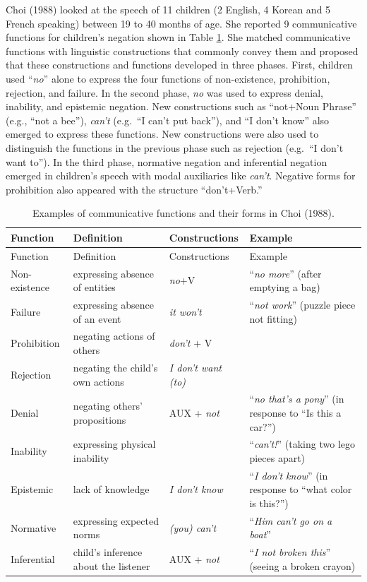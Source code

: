 \documentclass[
  english,
  man,floatsintext]{apa6}
\begin{document}
Choi (1988) looked at the speech of 11 children (2 English, 4 Korean and 5 French speaking) between 19 to 40 months of age. She reported 9 communicative functions for children's negation shown in Table \ref{tab:choi}. She matched communicative functions with linguistic constructions that commonly convey them and proposed that these constructions and functions developed in three phases. First, children used ``\emph{no}'' alone to express the four functions of non-existence, prohibition, rejection, and failure. In the second phase, \emph{no} was used to express denial, inability, and epistemic negation. New constructions such as ``not+Noun Phrase'' (e.g., ``not a bee''), \emph{can't} (e.g.~``I can't put back''), and ``I don't know'' also emerged to express these functions. New constructions were also used to distinguish the functions in the previous phase such as rejection (e.g.~``I don't want to''). In the third phase, normative negation and inferential negation emerged in children's speech with modal auxiliaries like \emph{can't}. Negative forms for prohibition also appeared with the structure ``don't+Verb.''

\begin{longtable}[]{@{}
  >{\raggedright\arraybackslash}p{}
  >{\raggedright\arraybackslash}p{}
  >{\raggedright\arraybackslash}p{}
  >{\raggedright\arraybackslash}p{}@{}}
\caption{\label{tab:choi} Examples of communicative functions and their forms in Choi (1988).}\tabularnewline
\toprule
Function & Definition & Constructions & Example \\
\midrule
\endfirsthead
\toprule
Function & Definition & Constructions & Example \\
\midrule
\endhead
Non-existence & expressing absence of entities & \emph{no}+V & ``\emph{no more}'' (after emptying a bag) \\
Failure & expressing absence of an event & \emph{it won't} & ``\emph{not work}'' (puzzle piece not fitting) \\
Prohibition & negating actions of others & \emph{don't} + V & \\
Rejection & negating the child's own actions & \emph{I don't want (to)} & \\
Denial & negating others' propositions & AUX + \emph{not} & ``\emph{no that's a pony}'' (in response to ``Is this a car?'') \\
Inability & expressing physical inability & & ``\emph{can't!}'' (taking two lego pieces apart) \\
Epistemic & lack of knowledge & \emph{I don't know} & ``\emph{I don't know}'' (in response to ``what color is this?'') \\
Normative & expressing expected norms & \emph{(you) can't} & ``\emph{Him can't go on a boat}'' \\
Inferential & child's inference about the listener & AUX + \emph{not} & ``\emph{I not broken this}'' (seeing a broken crayon) \\
\bottomrule
\end{longtable}
\end{document}
